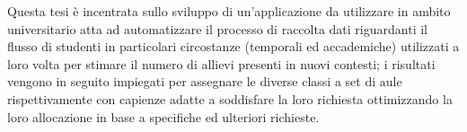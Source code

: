\abstract
Questa tesi è incentrata sullo sviluppo di un'applicazione da utilizzare in ambito universitario 
atta ad automatizzare il processo di raccolta dati riguardanti il flusso di studenti in particolari 
circostanze (temporali ed accademiche) utilizzati a loro volta per stimare il numero di allievi presenti in 
nuovi contesti; i risultati vengono in seguito impiegati per assegnare le diverse classi a set di aule 
rispettivamente con capienze adatte a soddisfare la loro richiesta ottimizzando la loro allocazione 
in base a specifiche ed ulteriori richieste.